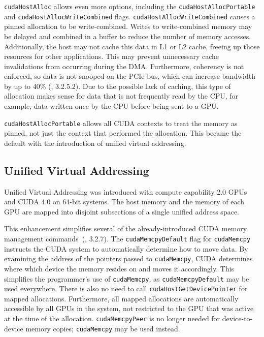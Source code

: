 \begin{sloppypar}
\texttt{cudaHostAlloc} allows even more options, including the \texttt{cudaHostAllocPortable} and \texttt{cudaHostAllocWriteCombined} flags.
\texttt{cudaHostAllocWriteCombined} causes a pinned allocation to be write-combined.
Writes to write-combined memory may be delayed and combined in a buffer to reduce the number of memory accesses.
Additionally, the host may not cache this data in L1 or L2 cache, freeing up those resources for other applications.
This may prevent unnecessary cache invalidations from occurring during the DMA.
Furthermore, coherency is not enforced, so data is not snooped on the PCIe bus, which can increase bandwidth by up to 40\% (\cite{nvidia2010cuda30}, 3.2.5.2).
Due to the possible lack of caching, this type of allocation makes sense for data that is not frequently read by the CPU, for example, data written once by the CPU before being sent to a GPU.
\end{sloppypar}

\texttt{cudaHostAllocPortable} allows all CUDA contexts to treat the memory as pinned, not just the context that performed the allocation.
This became the default with the introduction of unified virtual addressing.

\subsection{Unified Virtual Addressing}
\label{sec:uva}

Unified Virtual Addressing was introduced with compute capability 2.0 GPUs and CUDA 4.0 on 64-bit systems.
The host memory and the memory of each GPU are mapped into disjoint subsections of a single unified address space.

This enhancement simplifies several of the already-introduced CUDA memory management commands~(\cite{nvidia2011cudac40}, 3.2.7).
The \texttt{cudaMemcpyDefault} flag for \texttt{cudaMemcpy} instructs the CUDA system to automatically determine how to move data.
By examining the address of the pointers passed to \texttt{cudaMemcpy}, CUDA determines where which device the memory resides on and moves it accordingly.
This simplifies the programmer's use of \texttt{cudaMemcpy}, as \texttt{cudaMemcpyDefault} may be used everywhere.
There is also no need to call \texttt{cudaHostGetDevicePointer} for mapped allocations.
Furthermore, all mapped allocations are automatically accessible by all GPUs in the system, not restricted to the GPU that was active at the time of the allocation.
\texttt{cudaMemcpyPeer} is no longer needed for device-to-device memory copies; \texttt{cudaMemcpy} may be used instead.

